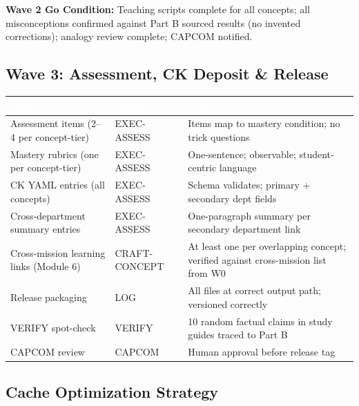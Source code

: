 \documentclass[11pt,letterpaper]{article}
\newcommand{\tableheader}[1]{\textbf{\sffamily\textcolor{white}{#1}}}
\begin{document}
\textbf{Wave 2 Go Condition:} Teaching scripts complete for all concepts; all misconceptions confirmed against Part B sourced results (no invented corrections); analogy review complete; CAPCOM notified.

\subsection{Wave 3: Assessment, CK Deposit \& Release}

\begin{center}
\begin{tabularx}{\textwidth}{L{3.5cm}C{2cm}X}
\toprule
{}
\tableheader{Task} & \tableheader{Agent} & \tableheader{Gate} \\
\midrule
Assessment items (2--4 per concept-tier) & EXEC-ASSESS & Items map to mastery condition; no trick questions \\
Mastery rubrics (one per concept-tier) & EXEC-ASSESS & One-sentence; observable; student-centric language \\
CK YAML entries (all concepts) & EXEC-ASSESS & Schema validates; primary + secondary dept fields \\
Cross-department summary entries & EXEC-ASSESS & One-paragraph summary per secondary department link \\
Cross-mission learning links (Module 6) & CRAFT-CONCEPT & At least one per overlapping concept; verified against cross-mission list from W0 \\
Release packaging & LOG & All files at correct output path; versioned correctly \\
VERIFY spot-check & VERIFY & 10 random factual claims in study guides traced to Part B \\
CAPCOM review & CAPCOM & Human approval before release tag \\
\bottomrule
\end{tabularx}
\end{center}

\subsection{Cache Optimization Strategy}
\end{document}
